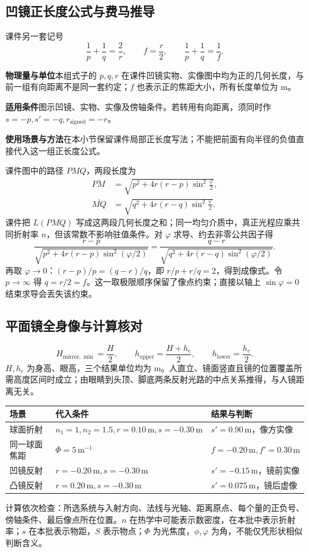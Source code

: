 \documentclass[UTF8,fontset=none,zihao=-4,a4paper]{ctexart}
\newcommand{\unit}[1]{\,\mathrm{#1}}
\newcommand{\explain}[3]{\par\noindent\textbf{物理量与单位}\quad #1\par
\noindent\textbf{适用条件}\quad #2\par
\noindent\textbf{使用场景与方法}\quad #3\par}
\begin{document}
\subsection{凹镜正长度公式与费马推导}
\begin{infobox}{课件另一套记号}
\[
 \frac1p+\frac1q=\frac2r,\qquad f=\frac r2,
 \qquad\frac1p+\frac1q=\frac1f.
\]
\end{infobox}
\explain{本组式子的 $p,q,r$ 在课件凹镜实物、实像图中均为正的几何长度，与前一组有向距离不是同一套约定；$f$ 也表示正的焦距大小，所有长度单位为 m。}{图示凹镜、实物、实像及傍轴条件。若转用有向距离，须同时作 $s=-p,s'=-q,r_{\mathrm{signed}}=-r$。}{在本小节保留课件局部正长度写法；不能把前面有向半径的负值直接代入这一组正长度公式。}
课件图中的路径 $PMQ$，两段长度为
\begin{align*}
 \overline{PM}&=\sqrt{p^2+4r(r-p)\sin^2\frac\varphi2},\\
 \overline{MQ}&=\sqrt{q^2+4r(r-q)\sin^2\frac\varphi2}.
\end{align*}
课件把 $L(PMQ)$ 写成这两段几何长度之和；同一均匀介质中，真正光程应乘共同折射率 $n$，但该常数不影响驻值条件。对 $\varphi$ 求导、约去非零公共因子得
\[
 \frac{r-p}{\sqrt{p^2+4r(r-p)\sin^2(\varphi/2)}}
 =\frac{q-r}{\sqrt{q^2+4r(r-q)\sin^2(\varphi/2)}}.
\]
再取 $\varphi\to0$：$(r-p)/p=(q-r)/q$，即 $r/p+r/q=2$，得到成像式。令 $p\to\infty$ 得 $q=r/2=f$。这一取极限顺序保留了像点约束；直接以轴上 $\sin\varphi=0$ 结束求导会丢失该约束。

\subsection{平面镜全身像与计算核对}
\[
 H_{\mathrm{mirror},\min}=\frac H2,\qquad
 h_{\mathrm{upper}}=\frac{H+h_e}2,\qquad
 h_{\mathrm{lower}}=\frac{h_e}2.
\]
$H,h_e$ 为身高、眼高，三个结果单位均为 m。人直立、镜面竖直且镜的位置覆盖所需高度区间时成立；由眼睛到头顶、脚底两条反射光路的中点关系推得，与人镜距离无关。

\begin{center}
\begin{tabularx}{\linewidth}{l Y Y}
\toprule
场景 & 代入条件 & 结果与判断\\
\midrule
球面折射 & $n_1=1,n_2=1.5,r=0.10\unit m,s=-0.30\unit m$ & $s'=0.90\unit m$，像方实像\\
同一球面焦距 & $\Phi=5\unit{m^{-1}}$ & $f=-0.20\unit m,f'=0.30\unit m$\\
凹镜反射 & $r=-0.20\unit m,s=-0.30\unit m$ & $s'=-0.15\unit m$，镜前实像\\
凸镜反射 & $r=0.20\unit m,s=-0.30\unit m$ & $s'=0.075\unit m$，镜后虚像\\
\bottomrule
\end{tabularx}
\end{center}
计算依次检查：所选系统与入射方向、法线与光轴、距离原点、每个量的正负号、傍轴条件、最后像点所在位置。$n$ 在热学中可能表示数密度，在本批中表示折射率；$s$ 在本批表示物距，$S$ 表示物点；$\Phi$ 为光焦度，$\phi,\varphi$ 为角，不能仅凭形状相似判断含义。
\end{document}
